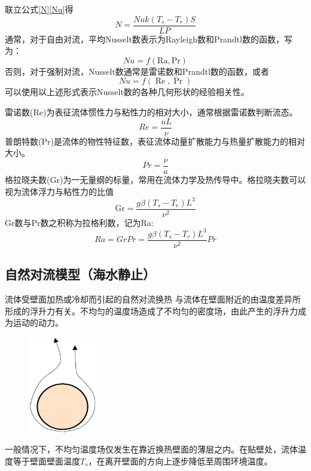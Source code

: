 \documentclass{article}
\begin{document}
   联立公式\eqref{N}\eqref{Nu}得
   \begin{equation}
   N=\frac{Nu k(T_s-T_r)S}{L P}
   \label{N2}
   \end{equation}
   通常，对于自由对流，平均Nusselt数表示为Rayleigh数和Prandtl数的函数，写为：
	\begin{equation}
	{Nu}=f(\mathrm{Ra}, \mathrm{Pr})
	\end{equation}
   否则，对于强制对流，Nusselt数通常是雷诺数和Prandtl数的函数，或者
   \begin{equation}
   {Nu}=f(\operatorname{Re}, \operatorname{Pr})
   \end{equation}
   可以使用以上述形式表示Nusselt数的各种几何形状的经验相关性。
   
   \noindent 雷诺数(Re)为表征流体惯性力与粘性力的相对大小，通常根据雷诺数判断流态。
	\begin{equation}
	R e=\frac{u L}{\nu}
	\end{equation}
   普朗特数(Pr)是流体的物性特征数，表征流体动量扩散能力与热量扩散能力的相对大小。
   \begin{equation}
   Pr=\frac{\nu}{a}
   \end{equation}
   格拉晓夫数(Gr)为一无量纲的标量，常用在流体力学及热传导中。格拉晓夫数可以视为流体浮力与粘性力的比值
   \begin{equation}
   \mathrm{Gr}=\frac{g \beta\left(T_{s}-T_{r}\right) L^{3}}{\nu^{2}}
   \end{equation}
   Gr数与Pr数之积称为拉格利数，记为Ra:
   \begin{equation}
   R a=G r Pr=\frac{g \beta\left(T_{s}-T_{r}\right) L^{3}}{\nu^{2}} Pr
   \label{Ra}
   \end{equation}
   
   \subsection{自然对流模型（海水静止）}   
   流体受壁面加热或冷却而引起的自然对流换热 与流体在壁面附近的由温度差异所形成的浮升力有关。不均匀的温度场造成了不均匀的密度场，由此产生的浮升力成为运动的动力。
   \begin{figure}
   	\includegraphics[width=3cm]{img/自然对流.png}
   \end{figure}
   一般情况下，不均匀温度场仅发生在靠近换热壁面的薄层之内。在贴壁处，流体温度等于壁面壁面温度$T_s$，在离开壁面的方向上逐步降低至周围环境温度。 
  
\end{document}
